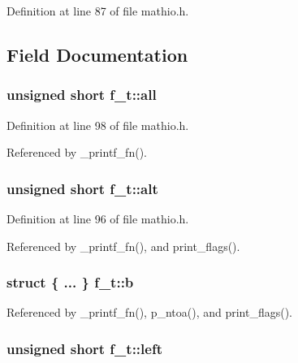 Definition at line 87 of file mathio.\+h.



\subsection{Field Documentation}
\subsubsection[{\texorpdfstring{all}{all}}]{\setlength{\rightskip}{0pt plus 5cm}unsigned short f\+\_\+t\+::all}\hypertarget{unionf__t_aab0615c9ada80b0f986b58639ea8c480}{}\label{unionf__t_aab0615c9ada80b0f986b58639ea8c480}


Definition at line 98 of file mathio.\+h.



Referenced by \+\_\+printf\+\_\+fn().

\subsubsection[{\texorpdfstring{alt}{alt}}]{\setlength{\rightskip}{0pt plus 5cm}unsigned short f\+\_\+t\+::alt}\hypertarget{unionf__t_a907a8d8af4803c9a18bc0586d22d6881}{}\label{unionf__t_a907a8d8af4803c9a18bc0586d22d6881}


Definition at line 96 of file mathio.\+h.



Referenced by \+\_\+printf\+\_\+fn(), and print\+\_\+flags().

\subsubsection[{\texorpdfstring{b}{b}}]{\setlength{\rightskip}{0pt plus 5cm}struct \{ ... \}   f\+\_\+t\+::b}\hypertarget{unionf__t_a37c0016009ff1f7ab1ef6697d9024a19}{}\label{unionf__t_a37c0016009ff1f7ab1ef6697d9024a19}


Referenced by \+\_\+printf\+\_\+fn(), p\+\_\+ntoa(), and print\+\_\+flags().

\subsubsection[{\texorpdfstring{left}{left}}]{\setlength{\rightskip}{0pt plus 5cm}unsigned short f\+\_\+t\+::left}\hypertarget{unionf__t_a5f89cd6194ccc6a288f1fe31d39b2e64}{}\label{unionf__t_a5f89cd6194ccc6a288f1fe31d39b2e64}


